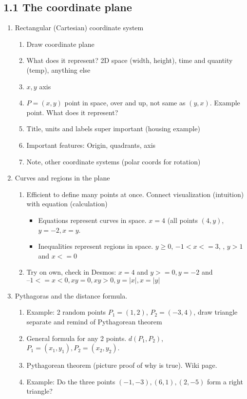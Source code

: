 \documentclass{article}
\begin{document}
\subsection{1.1 The coordinate plane}
\begin{enumerate}

\item Rectangular (Cartesian) coordinate system
\begin{enumerate}
\item Draw coordinate plane
\item What does it represent? 2D space (width, height), time and quantity (temp), anything else
\item $x,y$ axis
\item $P=(x,y)$ point in space, over and up, not same as $(y,x)$. Example point. What does it represent?
\item Title, units and labels super important (housing example)
\item Important features: Origin, quadrants, axis
\item Note, other coordinate systems (polar coords for rotation)
\end{enumerate}

\item Curves and regions in the plane
\begin{enumerate}
\item Efficient to define many points at once. Connect visualization (intuition) with equation (calculation)
\begin{itemize}
\item Equations represent curves in space. $x=4$ (all points $(4,y)$, $y=-2, x=y$.
\item Inequalities represent regions in space. $y\geq 0$, $-1 <x <=3$, , $y>1$ and $x<=0$
\end{itemize}
\item Try on own, check in Desmos: $x=4$ and $y>=0, y=-2$ and $–1<=x<0, xy=0, xy>0, y=|x|, x=|y|$
\end{enumerate}

\item Pythagoras and the distance formula.
\begin{enumerate}
\item Example: 2 random points $P_1=(1,2)$, $P_2=(-3,4)$, draw triangle separate and remind of Pythagorean theorem
\item General formula for any 2 points. $d(P_1,P_2)$, $P_1=(x_1,y_1), P_2=(x_2,y_2)$.
\item Pythagorean theorem (picture proof of why is true). Wiki page.
\item Example: Do the three points $(-1,-3), (6, 1), (2,-5)$ form a right triangle?
\end{enumerate}


\end{enumerate}
\end{document}

